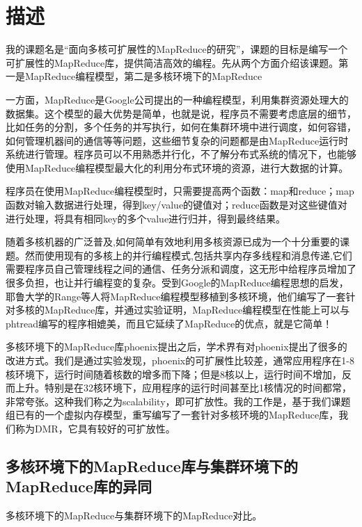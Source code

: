 \section{描述}
我的课题名是“面向多核可扩展性的MapReduce的研究”，课题的目标是编写一个可扩展性的MapReduce库，提供简洁高效的编程。先从两个方面介绍该课题。第一是MapReduce编程模型，第二是多核环境下的MapReduce

一方面，MapReduce是Google公司提出的一种编程模型，利用集群资源处理大的数据集。这个模型的最大优势是简单，也就是说，程序员不需要考虑底层的细节，比如任务的分割，多个任务的并写执行，如何在集群环境中进行调度，如何容错，如何管理机器间的通信等等问题，这些细节复杂的问题都是由MapReduce运行时系统进行管理。程序员可以不用熟悉并行化，不了解分布式系统的情况下，也能够使用MapReduce编程模型最大化的利用分布式环境的资源，进行大数据的计算。

程序员在使用MapReduce编程模型时，只需要提高两个函数：map和reduce；map函数对输入数据进行处理，得到key/value的键值对；reduce函数是对这些键值对进行处理，将具有相同key的多个value进行归并，得到最终结果。

随着多核机器的广泛普及,如何简单有效地利用多核资源已成为一个十分重要的课题。然而使用现有的多核上的并行编程模式,包括共享内存多线程和消息传递,它们需要程序员自己管理线程之间的通信、任务分派和调度，这无形中给程序员增加了很多负担，也让并行编程变的复杂。受到Google的MapReduce编程思想的启发，耶鲁大学的Range等人将MapReduce编程模型移植到多核环境，他们编写了一套针对多核的MapReduce库，并通过实验证明，MapReduce编程模型在性能上可以与phtread编写的程序相媲美，而且它延续了MapReduce的优点，就是它简单！

多核环境下的MapReduce库phoenix提出之后，学术界有对phoenix提出了很多的改进方式。我们是通过实验发现，phoenix的可扩展性比较差，通常应用程序在1-8核环境下，运行时间随着核数的增多而下降；但是8核以上，运行时间不增加，反而上升。特别是在32核环境下，应用程序的运行时间甚至比1核情况的时间都常，非常夸张。这种我们称之为scalability，即可扩放性。我的工作是，基于我们课题组已有的一个虚拟内存模型，重写编写了一套针对多核环境的MapReduce库，我们称为DMR，它具有较好的可扩放性。

\subsection{多核环境下的MapReduce库与集群环境下的MapReduce库的异同}
多核环境下的MapReduce与集群环境下的MapReduce对比。

